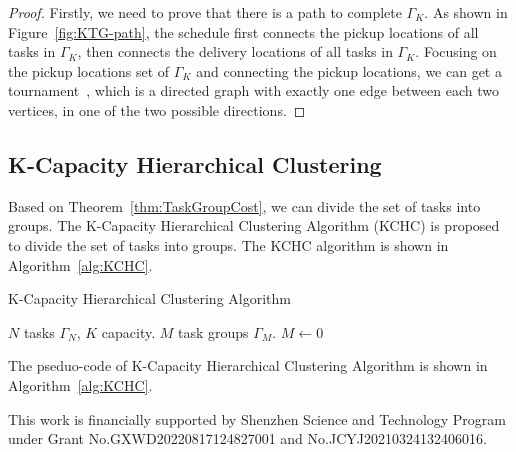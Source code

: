 \documentclass[sigconf,anonymous]{aamas}
\begin{document}
\begin{proof}
    Firstly, we need to prove that there is a path to complete $\Gamma_K$.
    As shown in Figure~\ref{fig:KTG-path},
    the schedule first connects the pickup locations of all tasks in $\Gamma_K$,
    then connects the delivery locations of all tasks in $\Gamma_K$.
    Focusing on the pickup locations set of $\Gamma_K$
    and connecting the pickup locations,
    we can get a tournament~\cite{enwiki:1234378036}, 
    which is a directed graph with exactly one edge between each two vertices, 
    in one of the two possible directions.


    

\end{proof}

\subsection{K-Capacity Hierarchical Clustering}

Based on Theorem~\ref{thm:TaskGroupCost}, we can divide the set of tasks into groups.
The K-Capacity Hierarchical Clustering Algorithm (KCHC)
is proposed to divide the set of tasks into groups.
The KCHC algorithm is shown in Algorithm~\ref{alg:KCHC}.

\begin{algorithm}[ht]
\caption{K-Capacity Hierarchical Clustering Algorithm}
\label{alg:KCHC}
\begin{algorithmic}
\REQUIRE $N$ tasks $\Gamma_{N}$, $K$ capacity.
\ENSURE $M$ task groups $\Gamma_{M}$.
\STATE $M \leftarrow 0$
\end{algorithmic}
\end{algorithm}

The pseduo-code of K-Capacity Hierarchical Clustering Algorithm is shown in Algorithm~\ref{alg:KCHC}.

\balance



\begin{acks}
  This work is financially supported by Shenzhen Science and Technology Program 
  under Grant No.GXWD20220817124827001 and No.JCYJ20210324132406016.
\end{acks}



 


\end{document}
